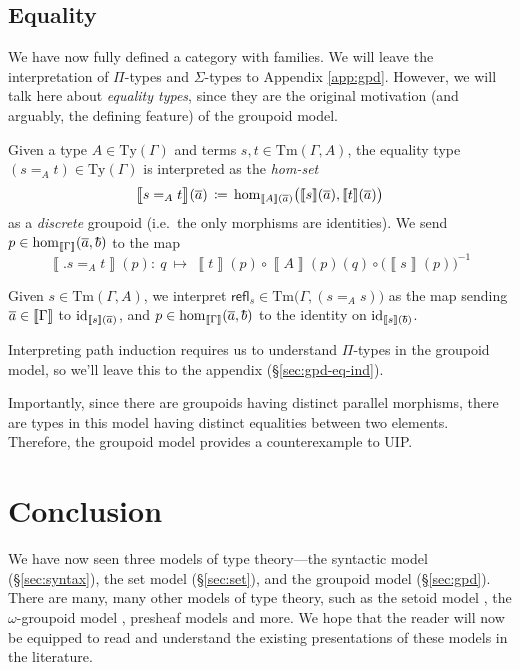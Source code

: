 \documentclass{article}
\theoremstyle{definition}
\renewcommand{\int}[1]{\mathopen{}\left\llbracket #1
    \right\rrbracket\mathclose{}}       %
\newcommand{\refl}{\mathsf{refl}}
\newcommand{\Ty}{\mathrm{Ty}}
\newcommand{\Tm}{\mathrm{Tm}}
\renewcommand{\hom}[3][]{\mathrm{hom}_{#1}\mathopen{}\left( #2, #3 \right)\mathclose{}}
\newcommand{\inv}[1]{#1^{-1}}
\DeclareMathOperator{\id}{id}				    %
\newcommand{\defeq}{
	\mathrel{\mathrel{\mathop:}\mkern-1.2mu=}}	%
\newcommand{\tup}[1]{\overline{\smash{#1}\vphantom{a}}}
\begin{document}
\subsection{Equality}
\label{sec:gpd-eq}

We have now fully defined a category with families. We will leave the interpretation of $\Pi$-types and $\Sigma$-types to Appendix \ref{app:gpd}. However, we will talk here about \textit{equality types}, since they are the original motivation (and arguably, the defining feature) of the groupoid model.

Given a type $A \in \Ty(\Gamma)$ and terms $s, t \in \Tm(\Gamma, A)$, the equality type $(s =_A t) \in \Ty(\Gamma)$ is interpreted as the \textit{hom-set}
$$\int{\big.s =_A t}(\tup{a})\, \defeq\, \hom[\int{A}(\tup{a})]{\big.\int{s}(\tup{a})}{\int{t}(\tup{a})}$$
as a \textit{discrete} groupoid (i.e.\ the only morphisms are identities). We send $p \in \hom[\int{\Gamma}]{\tup{a}}{\tup{b}}$ to the map $$\int{\big.s =_A t}(p)\colon\ q\ \mapsto\ \int{t}(p) \circ \int{A}(p)(q) \circ \inv{\big( \int{s}(p) \big)}$$

Given $s \in \Tm(\Gamma,A)$, we interpret $\refl_s \in \Tm\big(\Gamma, (s =_A s) \big)$ as the map sending $\tup{a} \in \int{\Gamma}$ to $\id_{\int{s}(\tup{a})}$, and $p \in \hom[\int{\Gamma}]{\tup{a}}{\tup{b}}$ to the identity on $\id_{\int{s}(\tup{b})}$.

Interpreting path induction requires us to understand $\Pi$-types in the groupoid model, so we'll leave this to the appendix (\S\ref{sec:gpd-eq-ind}).

Importantly, since there are groupoids having distinct parallel morphisms, there are types in this model having distinct equalities between two elements. Therefore, the groupoid model provides a counterexample to UIP.


\section{Conclusion}

We have now seen three models of type theory---the syntactic model (\S\ref{sec:syntax}), the set model (\S\ref{sec:set}), and the groupoid model (\S\ref{sec:gpd}). There are many, many other models of type theory, such as the setoid model \cite{setoid}, the $\omega$-groupoid model \cite{om-gpoid}, presheaf models \cite{huber} and more. We hope that the reader will now be equipped to read and understand the existing presentations of these models in the literature.
\end{document}
